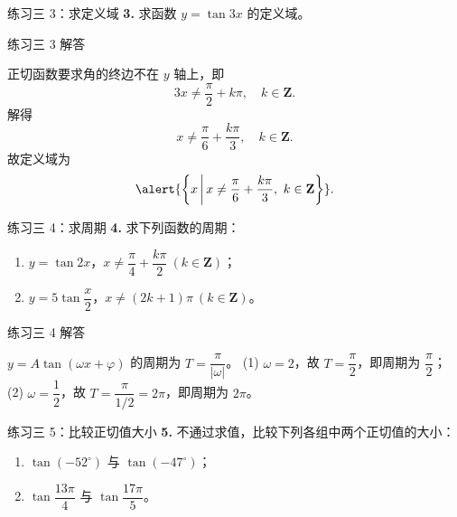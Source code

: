 \documentclass[10pt,aspectratio=169,serif]{beamer}
\begin{document}
\begin{frame}[t]{练习三 3：求定义域}
\textbf{3.} 求函数 $y=\tan 3x$ 的定义域。
\end{frame}

\begin{frame}[t]{练习三 3 解答}
\begin{tcolorbox}[colback=orange!10,colframe=orange,title=\textbf{解}]
正切函数要求角的终边不在 $y$ 轴上，即
\[
3x\ne\frac{\pi}{2}+k\pi,\quad k\in\mathbf Z.
\]
解得
\[
x\ne\frac{\pi}{6}+\frac{k\pi}{3},\quad k\in\mathbf Z.
\]
故定义域为
\[
\alert{\left\{x\,\middle|\,x\ne\frac{\pi}{6}+\frac{k\pi}{3},\ k\in\mathbf Z\right\}}.
\]
\end{tcolorbox}
\end{frame}

\begin{frame}[t]{练习三 4：求周期}
\textbf{4.} 求下列函数的周期：
\begin{enumerate}[(1)]
  \item $y=\tan 2x$，$x\ne\dfrac{\pi}{4}+\dfrac{k\pi}{2}\ (k\in\mathbf Z)$； \qquad
  \item $y=5\tan\dfrac{x}{2}$，$x\ne(2k+1)\pi\ (k\in\mathbf Z)$。
\end{enumerate}
\end{frame}

\begin{frame}[t]{练习三 4 解答}
\begin{tcolorbox}[colback=orange!10,colframe=orange,title=\textbf{解}]
$y=A\tan(\omega x+\varphi)$ 的周期为 $T=\dfrac{\pi}{|\omega|}$。
\vspace{0.3em}
(1) $\omega=2$，故 $T=\dfrac{\pi}{2}$，即周期为 \alert{$\dfrac{\pi}{2}$}；
\vspace{0.3em}
(2) $\omega=\dfrac12$，故 $T=\dfrac{\pi}{1/2}=2\pi$，即周期为 \alert{$2\pi$}。
\end{tcolorbox}
\end{frame}

\begin{frame}[t]{练习三 5：比较正切值大小}
\textbf{5.} 不通过求值，比较下列各组中两个正切值的大小：
\begin{enumerate}[(1)]
  \item $\tan(-52^\circ)$ 与 $\tan(-47^\circ)$； \qquad
  \item $\tan\dfrac{13\pi}{4}$ 与 $\tan\dfrac{17\pi}{5}$。
\end{enumerate}
\end{frame}
\end{document}
